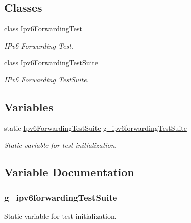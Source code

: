 \subsection*{Classes}
\begin{DoxyCompactItemize}
\item 
class \hyperlink{classIpv6ForwardingTest}{Ipv6\+Forwarding\+Test}
\begin{DoxyCompactList}\small\item\em I\+Pv6 Forwarding Test. \end{DoxyCompactList}\item 
class \hyperlink{classIpv6ForwardingTestSuite}{Ipv6\+Forwarding\+Test\+Suite}
\begin{DoxyCompactList}\small\item\em I\+Pv6 Forwarding Test\+Suite. \end{DoxyCompactList}\end{DoxyCompactItemize}
\subsection*{Variables}
\begin{DoxyCompactItemize}
\item 
static \hyperlink{classIpv6ForwardingTestSuite}{Ipv6\+Forwarding\+Test\+Suite} \hyperlink{ipv6-forwarding-test_8cc_a5348fc42702f61128dca5c2b58e7818a}{g\+\_\+ipv6forwarding\+Test\+Suite}
\begin{DoxyCompactList}\small\item\em Static variable for test initialization. \end{DoxyCompactList}\end{DoxyCompactItemize}


\subsection{Variable Documentation}
\subsubsection[{\texorpdfstring{g\+\_\+ipv6forwarding\+Test\+Suite}{g_ipv6forwardingTestSuite}}]{ g\+\_\+ipv6forwarding\+Test\+Suite\hspace{0.3cm}{\ttfamily [static]}}\hypertarget{ipv6-forwarding-test_8cc_a5348fc42702f61128dca5c2b58e7818a}{}\label{ipv6-forwarding-test_8cc_a5348fc42702f61128dca5c2b58e7818a}


Static variable for test initialization. 

